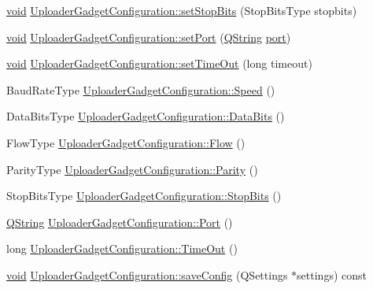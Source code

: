 \begin{DoxyCompactItemize}
\item 
\hyperlink{group___u_a_v_objects_plugin_ga444cf2ff3f0ecbe028adce838d373f5c}{void} \hyperlink{group___y_modem_uploader_ga4207c9c91330ae30a22867c428ade5e5}{\-Uploader\-Gadget\-Configuration\-::set\-Stop\-Bits} (\-Stop\-Bits\-Type stopbits)
\item 
\hyperlink{group___u_a_v_objects_plugin_ga444cf2ff3f0ecbe028adce838d373f5c}{void} \hyperlink{group___y_modem_uploader_gae74e20b5d71cdb225b581729bda7ef38}{\-Uploader\-Gadget\-Configuration\-::set\-Port} (\hyperlink{group___u_a_v_objects_plugin_gab9d252f49c333c94a72f97ce3105a32d}{\-Q\-String} \hyperlink{classport}{port})
\item 
\hyperlink{group___u_a_v_objects_plugin_ga444cf2ff3f0ecbe028adce838d373f5c}{void} \hyperlink{group___y_modem_uploader_ga4d3805496006d3cfdd8d1665d2b11654}{\-Uploader\-Gadget\-Configuration\-::set\-Time\-Out} (long timeout)
\item 
\-Baud\-Rate\-Type \hyperlink{group___y_modem_uploader_ga3cd2d8faf40a9fcb60022843bf36171d}{\-Uploader\-Gadget\-Configuration\-::\-Speed} ()
\item 
\-Data\-Bits\-Type \hyperlink{group___y_modem_uploader_ga3bf92d26250fea27e32f58eaf761c9d7}{\-Uploader\-Gadget\-Configuration\-::\-Data\-Bits} ()
\item 
\-Flow\-Type \hyperlink{group___y_modem_uploader_gac453b5e5875eeb4c1ded9a780608a188}{\-Uploader\-Gadget\-Configuration\-::\-Flow} ()
\item 
\-Parity\-Type \hyperlink{group___y_modem_uploader_gabdb93d527f297834e083e424edf4843c}{\-Uploader\-Gadget\-Configuration\-::\-Parity} ()
\item 
\-Stop\-Bits\-Type \hyperlink{group___y_modem_uploader_ga8f7d119b9f954ce05995540ca957568c}{\-Uploader\-Gadget\-Configuration\-::\-Stop\-Bits} ()
\item 
\hyperlink{group___u_a_v_objects_plugin_gab9d252f49c333c94a72f97ce3105a32d}{\-Q\-String} \hyperlink{group___y_modem_uploader_gabf25c5e3dabcb3c129987a2d266b73dc}{\-Uploader\-Gadget\-Configuration\-::\-Port} ()
\item 
long \hyperlink{group___y_modem_uploader_ga39f15ea85bd2c5de6f4a1a6d71f21032}{\-Uploader\-Gadget\-Configuration\-::\-Time\-Out} ()
\item 
\hyperlink{group___u_a_v_objects_plugin_ga444cf2ff3f0ecbe028adce838d373f5c}{void} \hyperlink{group___y_modem_uploader_gade32c98be91417bbf87148f4629b5c18}{\-Uploader\-Gadget\-Configuration\-::save\-Config} (\-Q\-Settings $\ast$settings) const 
\item 

\end{DoxyCompactItemize}
